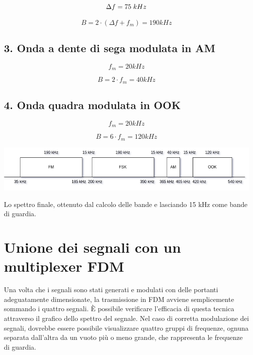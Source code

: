 \documentclass{article}
\begin{document}
\begin{equation}
    \Delta f = 75 \hspace{0.1cm} kHz
\end{equation}

\begin{equation}
    B = 2 \cdot (\Delta f + f_m) = 190 kHz
\end{equation}

\subsection{3. Onda a dente di sega modulata in AM}
\begin{equation}
    f_m = 20 kHz
\end{equation}

\begin{equation}
    B = 2 \cdot f_m = 40 kHz
\end{equation}

\subsection{4. Onda quadra modulata in OOK}
\begin{equation}
    f_m = 20 kHz
\end{equation}

\begin{equation}
    B = 6 \cdot f_m = 120 kHz
\end{equation}

\begin{center}
    \includegraphics[width=\textwidth]{bandwidth.png}
\end{center}
Lo spettro finale, ottenuto dal calcolo delle bande e lasciando 15 kHz come bande di guardia.

\section{Unione dei segnali con un multiplexer FDM}
Una volta che i segnali sono stati generati e modulati con delle portanti adeguatamente dimensionate, la trasmissione in FDM
avviene semplicemente sommando i quattro segnali. È possibile verificare l'efficacia di questa tecnica attraverso il grafico
dello spettro del segnale. Nel caso di corretta modulazione dei segnali, dovrebbe essere possibile visualizzare quattro gruppi
di frequenze, ognuna separata dall'altra da un vuoto più o meno grande, che rappresenta le frequenze di guardia.
\end{document}
